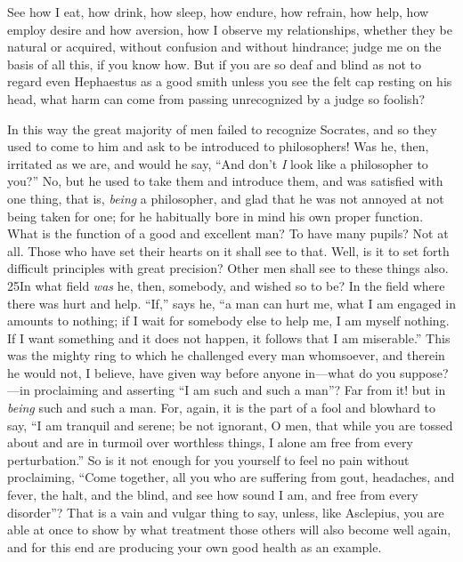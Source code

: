 See how I eat, how drink, how sleep, how endure, how refrain, how help, how employ desire and how aversion, how I observe my relationships, whether they be natural or acquired, without confusion and without hindrance; judge me on the basis of all this, if you know how. But if you are so deaf and blind as not to regard even Hephaestus as a good smith unless you see the felt cap resting on his head, what harm can come from passing unrecognized by a judge so foolish?

In this way the great majority of men failed to recognize Socrates, and so they used to come to him and ask to be introduced to philosophers! Was he, then, irritated as we are, and would he say, ``And don't \emph{I} look like a philosopher to you?'' No, but he used to take them and introduce them, and was satisfied with one thing, that is, \emph{being} a philosopher, and glad that he was not annoyed at not being taken for one; for he habitually bore in mind his own proper function. What is the function of a good and excellent man? To have many pupils? Not at all. Those who have set their hearts on it shall see to that. Well, is it to set forth difficult principles with great precision? Other men shall see to these things also. 25In what field \emph{was} he, then, somebody, and wished so to be? In the field where there was hurt and help. ``If,'' says he, ``a man can hurt me, what I am engaged in amounts to nothing; if I wait for somebody else to help me, I am myself nothing. If I want something and it does not happen, it follows that I am miserable.'' This was the mighty ring to which he challenged every man whomsoever, and therein he would not, I believe, have given way before anyone in—what do you suppose?—in proclaiming and asserting ``I am such and such a man''? Far from it! but in \emph{being} such and such a man. For, again, it is the part of a fool and blowhard to say, ``I am tranquil and serene; be not ignorant, O men, that while you are tossed about and are in turmoil over worthless things, I alone am free from every perturbation.'' So is it not enough for you yourself to feel no pain without proclaiming, ``Come together, all you who are suffering from gout, headaches, and fever, the halt, and the blind, and see how sound I am, and free from every disorder''? That is a vain and vulgar thing to say, unless, like Asclepius, you are able at once to show by what treatment those others will also become well again, and for this end are producing your own good health as an example.

